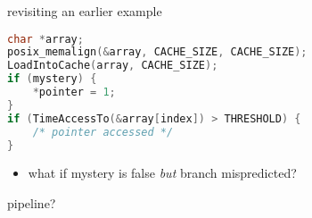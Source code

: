 \begin{frame}{revisiting an earlier example}
\begin{lstlisting}[language=C,style=smaller]
char *array;
posix_memalign(&array, CACHE_SIZE, CACHE_SIZE);
LoadIntoCache(array, CACHE_SIZE);
if (mystery) {
    *pointer = 1;
}
if (TimeAccessTo(&array[index]) > THRESHOLD) {
    /* pointer accessed */
}
\end{lstlisting}
\begin{itemize}
\item what if mystery is false \textit{but} branch mispredicted?
\end{itemize}
\end{frame}

\begin{frame}{pipeline?}
\end{frame}


